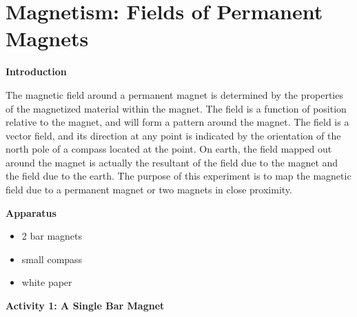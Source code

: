 \section{Magnetism: Fields of Permanent Magnets }


\makelabheader %

\bigskip
\textbf{Introduction} 

The magnetic field around a permanent magnet is determined by the properties 
of the magnetized material within the magnet. The field is a function of 
position relative to the magnet, and will form a pattern around the magnet. 
The field is a vector field, and its direction at any point is indicated by 
the orientation of the north pole of a compass located at the point. On earth, 
the field mapped out around the magnet is actually the resultant of the field 
due to the magnet and the field due to the earth. The purpose of this 
experiment is to map the magnetic field due to a permanent magnet or two 
magnets in close proximity.

\bigskip
\textbf{Apparatus}
\begin{itemize}[nosep]
\item 2 bar magnets 
\item small compass 
\item white paper
\end{itemize}
\medskip
\textbf{Activity 1: A Single Bar Magnet}

